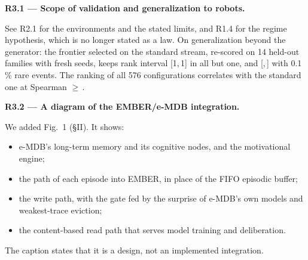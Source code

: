\documentclass[11pt]{article}
\newcommand{\comment}[1]{\par\medskip\noindent\textbf{#1}\par}
\begin{document}
\comment{R3.1 --- Scope of validation and generalization to robots.}
See R2.1 for the environments and the stated limits, and R1.4 for the regime
hypothesis, which is no longer stated as a law. On generalization beyond the
generator: the frontier selected on the standard stream, re-scored on 14
held-out families with fresh seeds, keeps rank interval [1,\,1] in all but
one, and
[,\,]
with 0.1\,\% rare events. The ranking of all 576 configurations correlates
with the standard one at Spearman
$\geq$\,.

\comment{R3.2 --- A diagram of the EMBER/e-MDB integration.}
We added Fig.~1 (§II). It shows:
\begin{itemize}
\item e-MDB's long-term memory and its cognitive nodes, and the motivational engine;
\item the path of each episode into EMBER, in place of the FIFO episodic buffer;
\item the write path, with the gate fed by the surprise of e-MDB's own models and weakest-trace eviction;
\item the content-based read path that serves model training and deliberation.
\end{itemize}
The caption states that it is a design, not an implemented integration.
\end{document}
